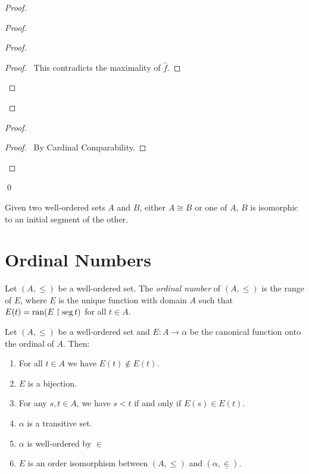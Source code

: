 \begin{proof}
\begin{proof}
\begin{proof}
\begin{proof}
                \pf\ This contradicts the maximality of $\hat{f}$.
            \end{proof}
        \end{proof}
    \end{proof}
    \begin{proof}
        \begin{proof}
            \pf\ By Cardinal Comparability.
        \end{proof}
    \end{proof}
    \qed
\end{proof}

\begin{theorem}
    Given two well-ordered sets $A$ and $B$, either $A \cong B$ or one of $A$, $B$
    is isomorphic to an initial segment of the other.
\end{theorem}

\section{Ordinal Numbers}

\begin{definition}
    Let $(A, \leq)$ be a well-ordered set. The \emph{ordinal number} of $(A, \leq)$
    is the range of $E$, where $E$ is the unique function with domain $A$
    such that $E(t) = \operatorname{ran} (E \restriction \operatorname{seg} t)$ for all $t \in A$.
\end{definition}

\begin{theorem}
    Let $(A, \leq)$ be a well-ordered set and $E : A \rightarrow \alpha$ be the
    canonical function onto the ordinal of $A$. Then:
    \begin{enumerate}
        \item For all $t \in A$ we have $E(t) \notin E(t)$.
        \item $E$ is a bijection.
        \item For any $s, t \in A$, we have $s < t$ if and only if $E(s) \in E(t)$.
        \item $\alpha$ is a transitive set.
        \item $\alpha$ is well-ordered by $\in$
        \item $E$ is an order isomorphism between $(A, \leq)$ and $(\alpha, \underline{\in})$.
    \end{enumerate}
\end{theorem}

